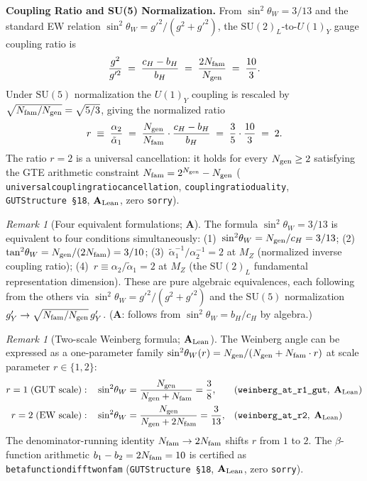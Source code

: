 \documentclass[11pt]{article}
\theoremstyle{remark}
\newtheorem{remark}[theorem]{Remark}
\newcommand{\Ngen}{N_{\rm gen}}
\newcommand{\Nfam}{N_{\rm fam}}
\newcommand{\bH}{b_H}
\newcommand{\cH}{c_H}
\newcommand{\lean}[1]{%
  \penalty-100
  \begingroup\def\_{\textunderscore\allowbreak}\texttt{#1}\endgroup}
\newcommand{\sinwsq}{\sin^2\!\theta_W}
\newcommand{\CatA}{\textbf{A}}
\newcommand{\CatAL}{\ensuremath{\textbf{A}_{\rm Lean}}}
\begin{document}
\medskip

\noindent\textbf{Coupling Ratio and SU(5) Normalization.}\enspace
From $\sinwsq = 3/13$ and the standard EW relation $\sinwsq = g'^2/(g^2 + g'^2)$,
the $\mathrm{SU}(2)_L$-to-$U(1)_Y$ gauge coupling ratio is
\begin{equation}
\label{eq:coupling_ratio}
  \frac{g^2}{g'^2} \;=\; \frac{\cH - \bH}{\bH} \;=\; \frac{2\Nfam}{\Ngen}
  \;=\; \frac{10}{3}.
\end{equation}
Under $\mathrm{SU}(5)$ normalization the $U(1)_Y$ coupling is rescaled by
$\sqrt{\Nfam/\Ngen} = \sqrt{5/3}$, giving the normalized ratio
\begin{equation}
  r \;\equiv\; \frac{\alpha_2}{\tilde{\alpha}_1}
  \;=\; \frac{\Ngen}{\Nfam} \cdot \frac{\cH - \bH}{\bH}
  \;=\; \frac{3}{5} \cdot \frac{10}{3} \;=\; 2.
\end{equation}
The ratio $r = 2$ is a universal cancellation: it holds for every $\Ngen \geq 2$
satisfying the GTE arithmetic constraint $\Nfam = 2^{\Ngen} - \Ngen$
(\lean{universal\_coupling\_ratio\_cancellation},
\lean{coupling\_ratio\_duality}, \texttt{GUTStructure~\S18}, $\CatAL$,
zero \texttt{sorry}).

\begin{remark}[Four equivalent formulations; $\CatA$]
\label{rem:four_equivalences}
The formula $\sinwsq = 3/13$ is equivalent to four conditions simultaneously:
(1)~$\sinwsq = \Ngen/\cH = 3/13$;
(2)~$\tan^2\!\theta_W = \Ngen/(2\Nfam) = 3/10$;
(3)~$\tilde{\alpha}_1^{-1}/\alpha_2^{-1} = 2$ at $M_Z$ (normalized inverse coupling ratio);
(4)~$r \equiv \alpha_2/\tilde{\alpha}_1 = 2$ at $M_Z$ (the $\mathrm{SU}(2)_L$ fundamental
representation dimension).
These are pure algebraic equivalences, each following from the others via
$\sinwsq = g'^2/(g^2 + g'^2)$ and the $\mathrm{SU}(5)$ normalization
$g'_Y \to \sqrt{\Nfam/\Ngen}\,g'_Y$.
($\CatA$: follows from $\sinwsq = b_H/c_H$ by algebra.)
\end{remark}

\begin{remark}[Two-scale Weinberg formula; $\CatAL$]
\label{rem:two_scale}
The Weinberg angle can be expressed as a one-parameter family
$\sinwsq(r) = \Ngen/(\Ngen + \Nfam \cdot r)$
at scale parameter $r \in \{1, 2\}$:
\begin{align*}
  r = 1\;(\text{GUT scale}):&\quad \sinwsq = \frac{\Ngen}{\Ngen + \Nfam} = \frac{3}{8},
    && (\lean{weinberg\_at\_r1\_gut},\;\CatAL) \\
  r = 2\;(\text{EW scale}):&\quad \sinwsq = \frac{\Ngen}{\Ngen + 2\Nfam} = \frac{3}{13},
    && (\lean{weinberg\_at\_r2},\;\CatAL)
\end{align*}
The denominator-running identity $\Nfam \to 2\Nfam$ shifts $r$ from $1$ to $2$.
The $\beta$-function arithmetic $b_1 - b_2 = 2\Nfam = 10$ is certified as
\lean{beta\_function\_diff\_two\_nfam} (\texttt{GUTStructure~\S18}, $\CatAL$,
zero \texttt{sorry}).
\end{remark}
\end{document}
